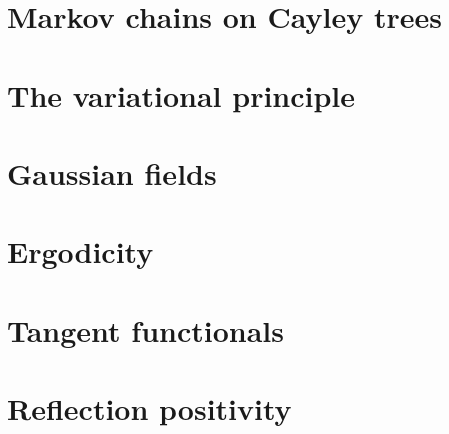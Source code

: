 \chapter{Markov chains on Cayley trees}




\chapter{The variational principle}







\chapter{Gaussian fields}





\chapter{Ergodicity}




\chapter{Tangent functionals}





\chapter{Reflection positivity}





